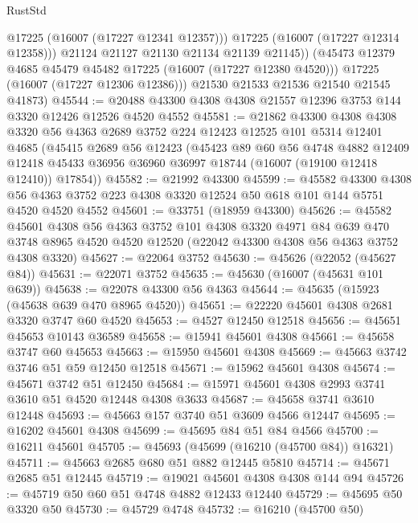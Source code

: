 \begin{lexlean}{RustStd}
\begin{coremodule}
                @17225
                (@16007 (@17227 @12341 @12357)))
              @17225
              (@16007 (@17227 @12314 @12358)))
            @21124
            @21127
            @21130
            @21134
            @21139
            @21145))
        (@45473 @12379 @4685 @45479 @45482 @17225 (@16007 (@17227 @12380 @4520)))
        @17225
        (@16007 (@17227 @12306 @12386)))
      @21530
      @21533
      @21536
      @21540
      @21545
      @41873)
@45544 := @20488 @43300 @4308 @4308 @21557 @12396 @3753 @144 @3320 @12426 @12526 @4520 @4552
@45581 := @21862
    @43300
    @4308
    @4308
    @3320
    @56
    @4363
    @2689
    @3752
    @224
    @12423
    @12525
    @101
    @5314
    @12401
    @4685
    (@45415
      @2689
      @56
      @12423
      (@45423
        @89
        @60
        @56
        @4748
        @4882
        @12409
        @12418
        @45433
        @36956
        @36960
        @36997
        @18744
        (@16007 (@19100 @12418 @12410))
        @17854))
@45582 := @21992 @43300
@45599 := @45582
    @43300
    @4308
    @56
    @4363
    @3752
    @223
    @4308
    @3320
    @12524
    @50
    @618
    @101
    @144
    @5751
    @4520
    @4520
    @4552
@45601 := @33751 (@18959 @43300)
@45626 := @45582
    @45601
    @4308
    @56
    @4363
    @3752
    @101
    @4308
    @3320
    @4971
    @84
    @639
    @470
    @3748
    @8965
    @4520
    @4520
    @12520
    (@22042 @43300 @4308 @56 @4363 @3752 @4308 @3320)
@45627 := @22064 @3752
@45630 := @45626 (@22052 (@45627 @84))
@45631 := @22071 @3752
@45635 := @45630 (@16007 (@45631 @101 @639))
@45638 := @22078 @43300 @56 @4363
@45644 := @45635 (@15923 (@45638 @639 @470 @8965 @4520))
@45651 := @22220 @45601 @4308 @2681 @3320 @3747 @60 @4520
@45653 := @4527 @12450 @12518
@45656 := @45651 @45653 @10143 @36589
@45658 := @15941 @45601 @4308
@45661 := @45658 @3747 @60 @45653
@45663 := @15950 @45601 @4308
@45669 := @45663 @3742 @3746 @51 @59 @12450 @12518
@45671 := @15962 @45601 @4308
@45674 := @45671 @3742 @51 @12450
@45684 := @15971 @45601 @4308 @2993 @3741 @3610 @51 @4520 @12448 @4308 @3633
@45687 := @45658 @3741 @3610 @12448
@45693 := @45663 @157 @3740 @51 @3609 @4566 @12447
@45695 := @16202 @45601 @4308
@45699 := @45695 @84 @51 @84 @4566
@45700 := @16211 @45601
@45705 := @45693 (@45699 (@16210 (@45700 @84)) @16321)
@45711 := @45663 @2685 @680 @51 @882 @12445 @5810
@45714 := @45671 @2685 @51 @12445
@45719 := @19021 @45601 @4308 @4308 @144 @94
@45726 := @45719 @50 @60 @51 @4748 @4882 @12433 @12440
@45729 := @45695 @50 @3320 @50
@45730 := @45729 @4748
@45732 := @16210 (@45700 @50)

\end{coremodule}
\end{lexlean}
